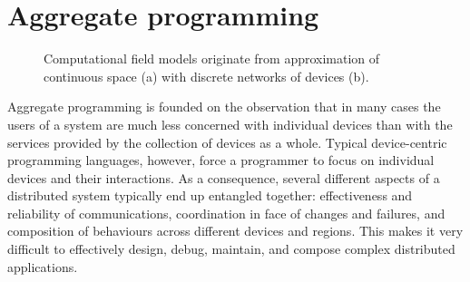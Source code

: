 \documentclass[12pt,a4paper,twoside,openright]{book}
\begin{document}
\section{Aggregate programming}

\begin{figure}
\centering
{}
\hspace{0.01\columnwidth}
\caption[Discrete approximation of continuous]{Computational field models originate from approximation of continuous space (a) with discrete networks of devices (b).}
\label{img:space}
\end{figure}

Aggregate programming is founded on the observation that in many cases the users of a system are much less concerned with individual devices than with the services provided by the collection of devices as a whole.
%
Typical device-centric programming languages, however, force a programmer to focus on individual devices and their interactions.
%
As a consequence, several different aspects of a distributed system typically end up entangled together: effectiveness and reliability of communications, coordination in face of changes and failures, and composition of behaviours across different devices and regions.
%
This makes it very difficult to effectively design, debug, maintain, and compose complex distributed applications.
\end{document}
